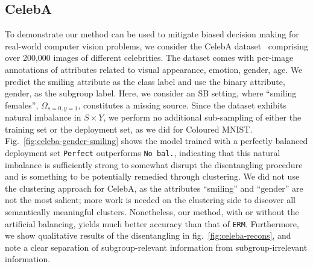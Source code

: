 \subsection{CelebA}
To demonstrate our method can be used to mitigate biased decision making for real-world computer vision problems, we consider the CelebA dataset~\citep{liu2015faceattributes} comprising over 200,000 images of different celebrities.
The dataset comes with per-image annotations of attributes related to visual appearance, emotion, gender, age.
%
We predict the smiling attribute as the class label and use the binary attribute, gender, as the subgroup label.
Here, we consider an SB setting, where ``smiling females'', $\Omega_{s=0, y=1}$, constitutes a missing source.
%
Since the dataset exhibits natural imbalance in $S \times Y$, we perform no additional sub-sampling of either the training set or the deployment set, as we did for Coloured MNIST.
%
Fig.~\ref{fig:celeba-gender-smiling} shows the model trained with a perfectly balanced deployment set \texttt{Perfect} outperforms \texttt{No bal.}, indicating that this natural imbalance is sufficiently strong to somewhat disrupt the disentangling procedure and is something to be potentially remedied through clustering.
%
We did not use the clustering approach for CelebA, as the attributes ``smiling'' and ``gender'' are not the most salient;
more work is needed on the clustering side to discover all semantically meaningful clusters.
%
Nonetheless, our method, with or without the artificial balancing, yields much better accuracy than that of \texttt{ERM}. Furthermore, we show qualitative results of the disentangling in fig.~\ref{fig:celeba-recons}, and note a clear separation of subgroup-relevant information from subgroup-irrelevant information.

%
  
